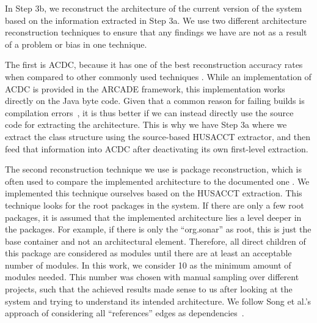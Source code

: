 \documentclass[sigplan, anonymous, review]{acmart}
\begin{document}
In Step 3b, we reconstruct the architecture of the current version of the system based on the information extracted in Step 3a. We use two different architecture reconstruction techniques to ensure that any findings we have are not as a result of a problem or bias in one technique.

The first is ACDC, because it has one of the best reconstruction accuracy rates when compared to other commonly used techniques \cite{arcRec-comparison}. 
While an implementation of ACDC is provided in the ARCADE framework, this implementation works directly on the Java byte code.  Given that a common reason for failing builds is compilation errors~\cite{CIFailTypes}, it is thus better if we can instead directly use the source code for extracting the architecture. This is why we have Step 3a where we extract the class structure using the source-based HUSACCT extractor, and then feed that information into ACDC after deactivating its own first-level extraction.

The second reconstruction technique we use is package reconstruction, which is often used to compare the implemented architecture to the documented one \cite{arcRec-comparison}. 
We implemented this technique ourselves based on the HUSACCT extraction.
This technique looks for the root packages in the system. If there are only a few root packages, it is assumed that the implemented architecture lies a level deeper in the packages. For example, if there is only the ``org.sonar'' as root, this is just the base container and not an architectural element. Therefore, all direct children of this package are considered as modules until there are at least an acceptable number of modules. In this work, we consider 10 as the minimum amount of modules needed. This number was chosen with manual sampling over different projects, such that the achieved results made sense to us after looking at the system and trying to understand its intended architecture. We follow Song et al.'s approach of considering all ``references'' edges as dependencies~\cite{ArcAsGraph}. 
\end{document}
